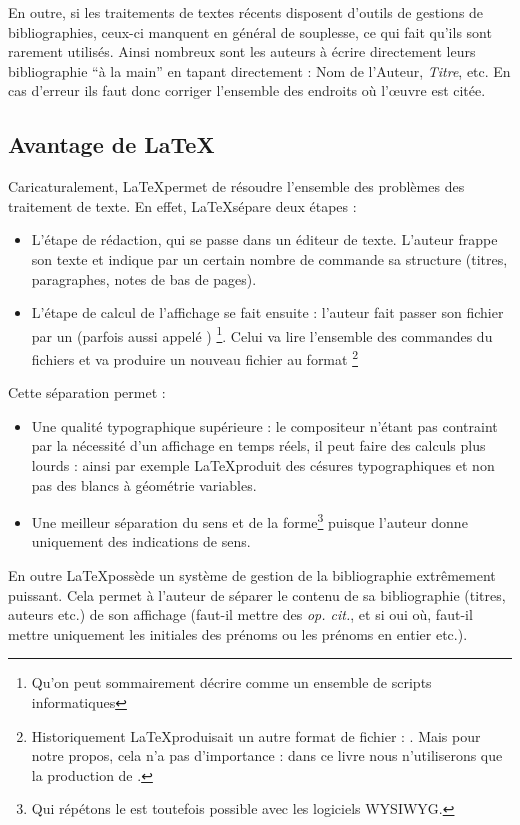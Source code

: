 En outre, si les traitements de textes récents disposent d'outils de gestions de bibliographies, ceux-ci manquent en général de souplesse, ce qui fait qu'ils sont rarement utilisés. Ainsi nombreux sont les auteurs à écrire directement leurs bibliographie \enquote{à la main} en tapant directement : Nom de l'Auteur, \emph{Titre}, etc. En cas d'erreur ils faut donc corriger l'ensemble des endroits où l'œuvre est citée.

\subsection{Avantage de \LaTeX}

Caricaturalement, \LaTeX permet de résoudre l'ensemble des problèmes des traitement de texte. En effet, \LaTeX sépare deux étapes : 

\begin{itemize}
\item L'étape de rédaction, qui se passe dans un éditeur de texte. L'auteur frappe son texte et indique par un certain nombre de commande sa structure (titres, paragraphes, notes de bas de pages).
\item L'étape de calcul de l'affichage se fait ensuite : l'auteur fait passer son fichier par un  (parfois aussi appelé ) \footnote{Qu'on peut sommairement décrire comme un ensemble de scripts informatiques}. Celui va lire l'ensemble des commandes du fichiers et va produire un nouveau fichier au format \footnote{Historiquement \LaTeX produisait un autre format de fichier : . Mais pour notre propos, cela n'a pas d'importance : dans ce livre nous n'utiliserons que la production de .}
\end{itemize}

Cette séparation permet :
\begin{itemize}
\item Une qualité typographique supérieure :  le compositeur n'étant pas contraint par la nécessité d'un affichage en temps réels, il peut faire des calculs plus lourds : ainsi par exemple \LaTeX produit des césures typographiques et non pas des blancs à géométrie variables.
\item Une meilleur séparation du sens et de la forme\footnote{Qui répétons le est toutefois possible avec les logiciels WYSIWYG.} puisque l'auteur donne uniquement des indications de sens.
\end{itemize}

En outre \LaTeX possède un système de gestion de la bibliographie extrêmement puissant. Cela permet à l'auteur de séparer le contenu de sa bibliographie (titres, auteurs etc.) de son affichage (faut-il mettre des \emph{op. cit.}, et si oui où, faut-il mettre uniquement les initiales des prénoms ou les prénoms en entier etc.).

